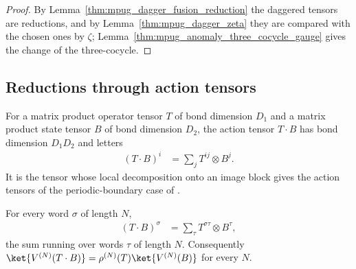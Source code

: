 \begin{proof}\leanok
    By Lemma~\ref{thm:mpug_dagger_fusion_reduction} the daggered tensors are
    reductions, and by Lemma~\ref{thm:mpug_dagger_zeta} they are compared with
    the chosen ones by $\zeta$; Lemma~\ref{thm:mpug_anomaly_three_cocycle_gauge}
    gives the change of the three-cocycle.
\end{proof}

\subsection{Reductions through action tensors}

\begin{definition}
    \label{def:mpug_action_tensor}
    \leanok
    For a matrix product operator tensor $T$ of bond dimension $D_1$ and a
    matrix product state tensor $B$ of bond dimension $D_2$, the action
    tensor $T\cdot B$ has bond dimension $D_1D_2$ and letters
    \begin{align}
        (T\cdot B)^i
         & =\sum_jT^{ij}\otimes B^j.
        \label{eq:mpug_action_tensor}
    \end{align}
    It is the tensor whose local decomposition onto an image block gives the
    action tensors of the periodic-boundary case of
    \cite[``Periodic boundary condition case'']{GarreRubio2023MPOSym}.
\end{definition}

\begin{lemma}
    \label{thm:mpug_action_tensor_periodic}
    \leanok
    For every word $\sigma$ of length $N$,
    \begin{align}
        (T\cdot B)^{\sigma}
         & =\sum_{\tau}T^{\sigma\tau}\otimes B^{\tau},
        \label{eq:mpug_action_tensor_word}
    \end{align}
    the sum running over words $\tau$ of length $N$. Consequently
    $\ket{V^{(N)}(T\cdot B)}=\rho^{(N)}(T)\ket{V^{(N)}(B)}$ for every $N$.
\end{lemma}

